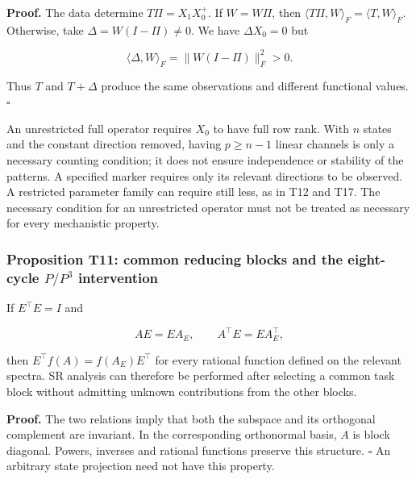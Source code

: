 \documentclass[11pt,a4paper]{article}
\begin{document}
\par
\noindent\begin{minipage}{\linewidth}

\textbf{Proof.} The data determine \(T\Pi=X_1X_0^+\). If \(W=W\Pi\),
then \(\langle T\Pi,W\rangle_F=\langle T,W\rangle_F\). Otherwise, take
\(\Delta=W(I-\Pi)\ne0\). We have \(\Delta X_0=0\) but

\[
\langle\Delta,W\rangle_F=\|W(I-\Pi)\|_F^2>0.
\]

\end{minipage}\par

Thus \(T\) and \(T+\Delta\) produce the same observations and different
functional values. \(\square\)

An unrestricted full operator requires \(X_0\) to have full row rank.
With \(n\) states and the constant direction removed, having
\(p\ge n-1\) linear channels is only a necessary counting condition; it
does not ensure independence or stability of the patterns. A specified
marker requires only its relevant directions to be observed. A
restricted parameter family can require still less, as in T12 and T17.
The necessary condition for an unrestricted operator must not be treated
as necessary for every mechanistic property.

\subsubsection{\texorpdfstring{Proposition T11: common reducing blocks
and the eight-cycle \(P/P^3\)
intervention}{Proposition T11: common reducing blocks and the eight-cycle P/P\^{}3 intervention}}\label{proposition-t11-common-reducing-blocks-and-the-eight-cycle-pp3-intervention}

\par
\noindent\begin{minipage}{\linewidth}

If \(E^\top E=I\) and

\[
AE=EA_E,\qquad A^\top E=EA_E^\top,
\]

\end{minipage}\par

then \(E^\top f(A)=f(A_E)E^\top\) for every rational function defined on
the relevant spectra. SR analysis can therefore be performed after
selecting a common task block without admitting unknown contributions
from the other blocks.

\textbf{Proof.} The two relations imply that both the subspace and its
orthogonal complement are invariant. In the corresponding orthonormal
basis, \(A\) is block diagonal. Powers, inverses and rational functions
preserve this structure. \(\square\) An arbitrary state projection need
not have this property.
\end{document}
